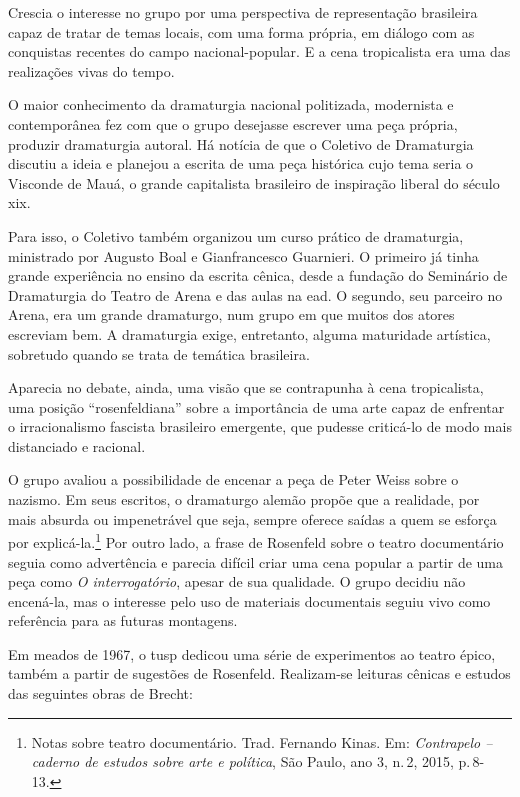 Crescia o interesse no grupo por uma perspectiva de representação
brasileira capaz de tratar de temas locais, com uma forma própria, em
diálogo com as conquistas recentes do campo nacional-popular. E a cena
tropicalista era uma das realizações vivas do tempo.

O maior conhecimento da dramaturgia nacional politizada, modernista e
contemporânea fez com que o grupo desejasse escrever uma peça própria,
produzir dramaturgia autoral. Há notícia de que o Coletivo de
Dramaturgia discutiu a ideia e planejou a escrita de uma peça histórica
cujo tema seria o Visconde de Mauá, o grande capitalista brasileiro
de inspiração liberal do século {\sc xix}.

Para isso, o Coletivo também organizou um curso prático
de dramaturgia, ministrado por Augusto Boal e Gianfrancesco Guarnieri. O
primeiro já tinha grande experiência no ensino da escrita cênica, desde
a fundação do Seminário de Dramaturgia do Teatro de Arena e das aulas na
{\sc ead}. O segundo, seu parceiro no Arena, era um grande dramaturgo, num
grupo em que muitos dos atores escreviam bem. A dramaturgia exige,
entretanto, alguma maturidade artística, sobretudo quando se trata de
temática brasileira.

Aparecia no debate, ainda, uma visão que se contrapunha à cena
tropicalista, uma posição “rosenfeldiana” sobre a importância de uma
arte capaz de enfrentar o irracionalismo fascista brasileiro emergente,
que pudesse criticá-lo de modo mais distanciado e racional.

O grupo avaliou a possibilidade de encenar a peça de Peter Weiss sobre o nazismo. Em seus escritos, o dramaturgo alemão propõe que a realidade, por
mais absurda ou impenetrável que seja, sempre oferece saídas a quem se
esforça por explicá-la.\footnote{Notas sobre teatro documentário.
  Trad. Fernando Kinas. Em: {\it Contrapelo -- caderno de estudos sobre arte e
    política}, São Paulo, ano 3, n.\,2, 2015, p.\,8-13.} Por outro lado, a
frase de Rosenfeld sobre o teatro documentário seguia como advertência e
parecia difícil criar uma cena popular a partir de uma peça como {\it O
interrogatório}, apesar de sua qualidade. O grupo decidiu não
encená-la, mas o interesse pelo uso de materiais documentais seguiu vivo
como referência para as futuras montagens.

Em meados de 1967, o {\sc tusp} dedicou uma série de experimentos ao teatro
épico, também a partir de sugestões de Rosenfeld. Realizam-se
leituras cênicas e estudos das seguintes obras de Brecht:

